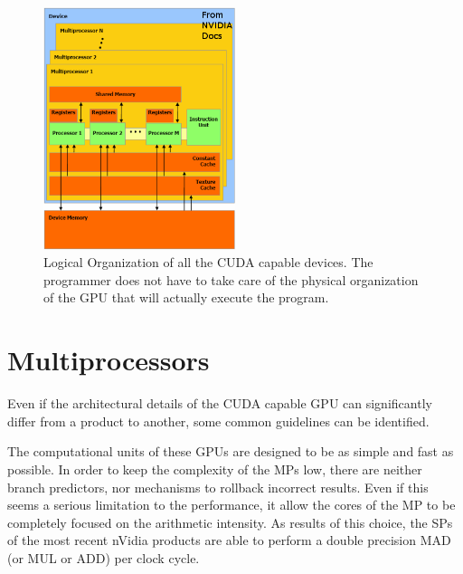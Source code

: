 \begin{figure}[h!bt]
	\centerline{\includegraphics[width=0.5\textwidth]{img/HWModel.png}}
	\caption{Logical Organization of all the CUDA capable devices. The programmer does not have to take care of the physical organization of the GPU that will actually execute the program.}
	\label{fig:nVidiaGPUsLogicalOrg}
\end{figure}

\section{Multiprocessors}
Even if the architectural details of the CUDA capable GPU can significantly differ from a product to another, some common guidelines can be identified.

The computational units of these GPUs are designed to be as simple and fast as possible. In order to keep the complexity of the MPs low, there are neither branch predictors, nor mechanisms to rollback incorrect results. Even if this seems a serious limitation to the performance, it allow the cores of the MP to be completely focused on the arithmetic intensity. As results of this choice, the SPs of the most recent nVidia products are able to perform a double precision MAD (or MUL or ADD) per clock cycle.\\

